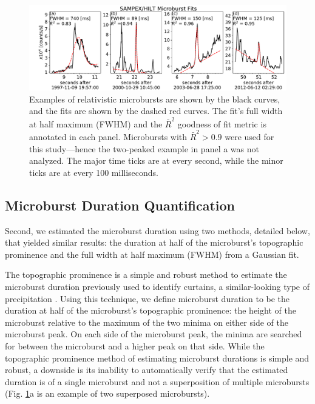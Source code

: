\documentclass[draft]{agujournal2019}
\begin{document}
\begin{figure}
\noindent\includegraphics[width=\textwidth]{figures/fig1.pdf}
\caption{Examples of relativistic microbursts are shown by the black curves, and the fits are shown by the dashed red curves. The fit's full width at half maximum (FWHM) and the $\bar{R}^2$ goodness of fit metric is annotated in each panel. Microbursts with $\bar{R}^2 > 0.9$ were used for this study---hence the two-peaked example in panel a was not analyzed. The major time ticks are at every second, while the minor ticks are at every 100 milliseconds.}
\label{fig1}
\end{figure}

\subsection{Microburst Duration Quantification}
Second, we estimated the microburst duration using two methods, detailed below, that yielded similar results: the duration at half of the microburst's topographic prominence and the full width at half maximum (FWHM) from a Gaussian fit.

The topographic prominence is a simple and robust method to estimate the microburst duration previously used to identify curtains, a similar-looking type of precipitation \cite{Shumko2020b}. Using this technique, we define microburst duration to be the duration at half of the microburst's topographic prominence: the height of the microburst relative to the maximum of the two minima on either side of the microburst peak. On each side of the microburst peak, the minima are searched for between the microburst and a higher peak on that side. While the topographic prominence method of estimating microburst durations is simple and robust, a downside is its inability to automatically verify that the estimated duration is of a single microburst and not a superposition of multiple microbursts (Fig. \ref{fig1}a is an example of two superposed microbursts).
\end{document}
